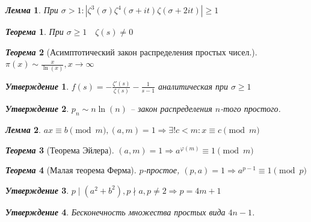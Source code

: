 \documentclass[a4paper,12pt]{article}
\newtheorem{teo2}{\textit{Теорема}}
\newtheorem{utv2}{\textit{Утверждение}}
\newtheorem{lem2}{\textit{Лемма}}
\newcommand{\ee}{\equiv}
\newcommand{\FI}{\varphi}
\newcommand{\q}{\quad}
\newcommand{\Ra}{\Rightarrow}
\begin{document}
\begin{formbox}{}
\begin{lem2} При $\sigma > 1: |\zeta^3(\sigma)\zeta^4(\sigma+it)\zeta(\sigma+2it)| \ge 1$
\end{lem2}
\end{formbox}
\begin{formbox}{}
\begin{teo2} При $\sigma \ge 1 \q \zeta(s) \not= 0$
\end{teo2}
\end{formbox}
\begin{formbox}{}
\begin{teo2}[Асимптотический закон распределения простых чисел.]\q\\
$\pi(x)\sim \frac{x}{\ln(x)}, x\to\infty$
\end{teo2}
\end{formbox}
\begin{formbox}{}
\begin{utv2} $f(s) = -\frac{\zeta'(s)}{\zeta(s)} - \frac{1}{s-1} $ аналитическая при $\sigma \ge 1$
\end{utv2}
\end{formbox}
\begin{formbox}{}
\begin{utv2} $p_n \sim n\ln(n)$ -- закон распределения $n$-того простого.
\end{utv2}
\end{formbox}
\begin{formbox}{}
\begin{lem2} $ax\ee b\pmod{m}, (a,m) = 1\Ra \exists!c<m:x\ee c\pmod{m}$
\end{lem2}
\end{formbox}
\begin{formbox}{}
\begin{teo2}[Теорема Эйлера] $(a,m) = 1\Ra a^{\FI(m)} \ee 1\pmod{m}$
\end{teo2}
\end{formbox}
\begin{formbox}{}
\begin{teo2}[Малая теорема Ферма] $p$-простое, $(p,a) = 1\Ra a^{p-1} \ee 1\pmod{p}$
\end{teo2}
\end{formbox}
\begin{formbox}{}
\begin{utv2} $p\mid (a^2+b^2), p\nmid a, p\not=2 \Ra p = 4m+1$
\end{utv2}
\end{formbox}
\begin{formbox}{}
\begin{utv2} Бесконечность множества простых вида $4n-1$.
\end{utv2}
\end{formbox}
\end{document}
